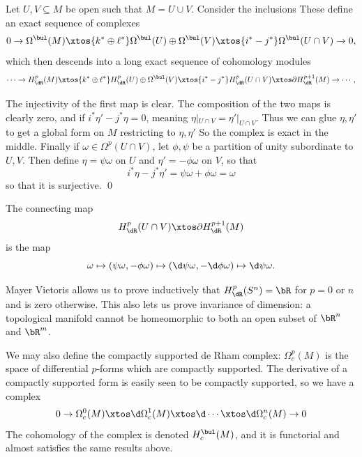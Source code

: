    Let $U,V\subseteq M$ be open such that $M=U\cup V$.
    Consider the inclusions
    These define an exact sequence of complexes
    $$ 0 \to \Omega^\bul(M) \xtos{k^*\oplus\ell^*} \Omega^\bul(U)\oplus\Omega^\bul(V) \xtos{i^*-j^*}
    \Omega^\bul(U\cap V) \to 0 , $$
    which then descends into a long exact sequence of cohomology modules
    $$ \cdots \to H_\dR^p(M) \xtos{k^*\oplus\ell^*} H_\dR^p(U)\oplus\Omega^\bul(V) \xtos{i^*-j^*}
    H_\dR^p(U\cap V) \xtos\partial H_\dR^{p+1}(M) \to \cdots , $$

\ethrm

\bproof

    The injectivity of the first map is clear.
    The composition of the two maps is clearly zero, and if $i^*\eta'-j^*\eta=0$, meaning $\eta|_{U\cap V}=\eta'|_{U\cap V}$.
    Thus we can glue $\eta,\eta'$ to get a global form on $M$ restricting to $\eta,\eta'$
    So the complex is exact in the middle.
    Finally if $\omega\in\Omega^p(U\cap V)$, let $\phi,\psi$ be a partition of unity subordinate to $U,V$.
    Then define $\eta=\psi\omega$ on $U$ and $\eta'=-\phi\omega$ on $V$, so that
    $$ i^*\eta - j^*\eta' = \psi\omega + \phi\omega = \omega $$
    so that it is surjective.
    \qed

\eproof

The connecting map
$$ H_\dR^p(U\cap V) \xtos\partial H_\dR^{p+1}(M) $$
is the map
$$ \omega \mapsto (\psi\omega,-\phi\omega) \mapsto (\d\psi\omega,-\d\phi\omega) \mapsto \d\psi\omega . $$

\bremark

    Mayer Vietoris allows us to prove inductively that $H^p_\dR(S^n)=\bR$ for $p=0$ or $n$ and is zero otherwise.
    This also lets us prove invariance of dimension: a topological manifold cannot be homeomorphic to both an open subset of
    $\bR^n$ and $\bR^m$.

\eremark

We may also define the compactly supported de Rham complex: $\Omega^p_c(M)$ is the space of differential $p$-forms which are
compactly supported.
The derivative of a compactly supported form is easily seen to be compactly supported, so we have a complex
$$ 0 \to \Omega_c^0(M) \xtos\d \Omega_c^1(M) \xtos\d \cdots \xtos\d \Omega_c^n(M) \to 0 $$
The cohomology of the complex is denoted $H_c^\bul(M)$, and it is functorial and almost satisfies the same results above.

